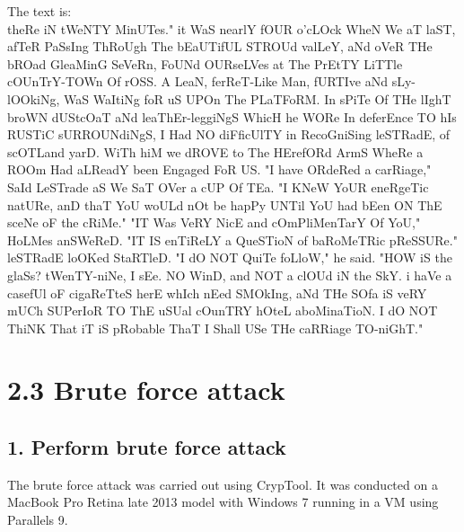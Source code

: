 The text is: \\
theRe iN tWeNTY MinUTes."
it WaS nearlY fOUR o'cLOck WheN We aT laST, afTeR PaSsIng ThRoUgh
The bEaUTifUL STROUd valLeY, aNd oVeR THe bROad GleaMinG SeVeRn,
FoUNd OURseLVes at The PrEtTY LiTTle cOUnTrY-TOWn Of rOSS. A
LeaN, ferReT-Like Man, fURTIve aNd sLy-lOOkiNg, WaS WaItiNg foR
uS UPOn The PLaTFoRM. In sPiTe Of THe lIghT broWN dUStcOaT aNd
leaThEr-leggiNgS WhicH he WORe In deferEnce TO hIs RUSTiC
sURROUNdiNgS, I Had NO diFficUlTY in RecoGniSing leSTRadE, of
scOTLand yarD. WiTh hiM we dROVE to The HErefORd ArmS WheRe a
ROOm Had aLReadY been Engaged FoR US.
"I have ORdeRed a carRiage," SaId LeSTrade aS We SaT OVer a cUP
Of TEa. "I KNeW YoUR eneRgeTic natURe, anD thaT YoU woULd nOt be
hapPy UNTil YoU had bEen ON ThE sceNe oF the cRiMe."
"IT Was VeRY NicE and cOmPliMenTarY Of YoU," HoLMes anSWeReD. "IT
IS enTiReLY a QueSTioN of baRoMeTRic pReSSURe."
leSTRadE loOKed StaRTleD. "I dO NOT QuiTe foLloW," he said.
"HOW iS the glaSs? tWenTY-niNe, I sEe. NO WinD, and NOT a clOUd
iN the SkY. i haVe a casefUl oF cigaReTteS herE whIch nEed
SMOkIng, aNd THe SOfa iS veRY mUCh SUPerIoR TO ThE uSUal cOunTRY
hOteL aboMinaTioN. I dO NOT ThiNK That iT iS pRobable ThaT I
Shall USe THe caRRiage TO-niGhT."

\section*{2.3 Brute force attack}

\subsection*{1. Perform brute force attack}

The brute force attack was carried out using CrypTool.
It was conducted on a MacBook Pro Retina late 2013 model with Windows 7 running in a VM using Parallels 9.

